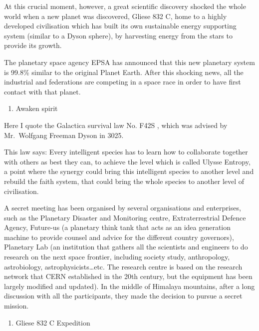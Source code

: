 At this crucial moment, however, a great scientific discovery shocked
the whole world when a new planet was discovered, Gliese 832 C, home to
a highly developed civilisation which has built its own sustainable
energy supporting system (similar to a Dyson sphere), by harvesting
energy from the stars to provide its growth.

The planetary space agency EPSA has announced that this new planetary
system is 99.8\% similar to the original Planet Earth. After this
shocking news, all the industrial and federations are competing in a
space race in order to have first contact with that planet.

\begin{enumerate}
\def\labelenumi{\arabic{enumi}.}
\setcounter{enumi}{4}
\tightlist
\item
  Awaken spirit
\end{enumerate}

Here I quote the Galactica survival law No. F42S , which was advised by
Mr.~Wolfgang Freeman Dyson in 3025.

This law says: Every intelligent species has to learn how to collaborate
together with others as best they can, to achieve the level which is
called Ulysse Entropy, a point where the synergy could bring this
intelligent species to another level and rebuild the faith system, that
could bring the whole species to another level of civilisation.

A secret meeting has been organised by several organisations and
enterprises, such as the Planetary Disaster and Monitoring centre,
Extraterrestrial Defence Agency, Future-us (a planetary think tank that
acts as an idea generation machine to provide counsel and advice for the
different country governors), Planetary Lab (an institution that gathers
all the scientists and engineers to do research on the next space
frontier, including society study, anthropology, astrobiology,
astrophysicists\ldots{}etc. The research centre is based on the research
network that CERN established in the 20th century, but the equipment has
been largely modified and updated). In the middle of Himalaya mountains,
after a long discussion with all the participants, they made the
decision to pursue a secret mission.

\begin{enumerate}
\def\labelenumi{\arabic{enumi}.}
\setcounter{enumi}{5}
\tightlist
\item
  Gliese 832 C Expedition
\end{enumerate}

